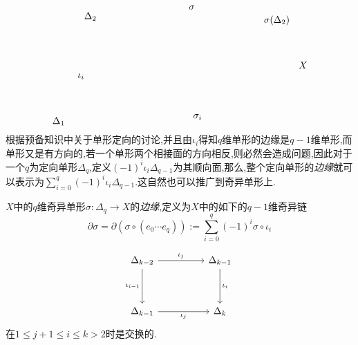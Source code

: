 \documentclass{article}
\begin{document}
\[\begin{tikzpicture}[x=0.75pt,y=0.75pt,yscale=-1,xscale=1]
\draw (422,191.4) node [anchor=north west][inner sep=0.75pt]    {$X$};
\draw (374,127.4) node [anchor=north west][inner sep=0.75pt]    {$\sigma ( \Delta _{2})$};
\draw (270,113.4) node [anchor=north west][inner sep=0.75pt]    {$\sigma $};
\draw (81,267.7) node [anchor=north west][inner sep=0.75pt]    {$\Delta _{1}$};
\draw (125,122.7) node [anchor=north west][inner sep=0.75pt]    {$\Delta _{2}$};
\draw (116,207.7) node [anchor=north west][inner sep=0.75pt]    {$\iota _{i}$};
\draw (276,263.7) node [anchor=north west][inner sep=0.75pt]    {$\sigma _{i}$};


\end{tikzpicture}\]    
根据预备知识中关于单形定向的讨论,并且由$\iota_i$得知$q$维单形的边缘是$q-1$维单形,而单形又是有方向的,若一个单形两个相接面的方向相反,则必然会造成问题,因此对于一个$q$为定向单形$\Delta_q$,定义$(-1)^i \iota_i \Delta_{q-1}$为其顺向面,那么,整个定向单形的\emph{边缘}就可以表示为$\sum_{i= 0}^q (-1)^i \iota_i \Delta_{q-1}$.这自然也可以推广到奇异单形上.
\begin{definition}
    $X$中的$q$维奇异单形$\sigma : \Delta_q  \to X$的\emph{边缘},定义为$X$中的如下的$q-1$维奇异链
    $$
    \partial \sigma = \partial( \sigma \circ (e_0\cdots e_q)) := \sum_{i = 0}^q(-1)^i \sigma \circ \iota_i
    $$
\end{definition}
\begin{lemma}
    \[\begin{tikzcd}
        {\Delta_{k-2}} && {\Delta_{k-1}} \\
        \\
        {\Delta_{k-1}} && {\Delta_k}
        \arrow["{\iota_j}", from=1-1, to=1-3]
        \arrow["{\iota_i}", from=1-3, to=3-3]
        \arrow["{\iota_{i-1}}"', from=1-1, to=3-1]
        \arrow["{\iota_j}"', from=3-1, to=3-3]
    \end{tikzcd}\]
    在$1 \leq j+1 \leq i \leq k>2$时是交换的.
    \label{lem:3.2.3}
\end{lemma}
\end{document}
